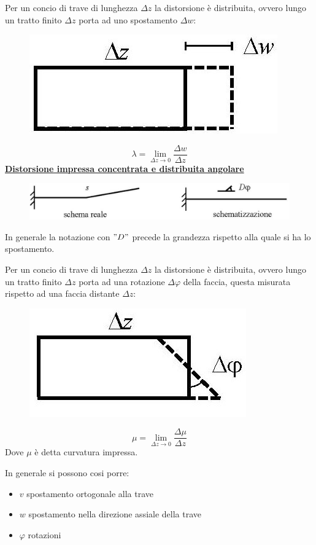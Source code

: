 \documentclass{article}
\begin{document}
\begin{adjustwidth}{2in}{}
		Per un concio di trave di lunghezza $ \Delta z$ la distorsione è distribuita, ovvero lungo un tratto finito $\Delta z$ porta ad uno spostamento $\Delta w$:

\begin{figure}[H]
	\centering
	\includegraphics[width=0.2\linewidth]{"immagini/1.PARTE8_Pagina_04 (3)"}
\end{figure}
		\[ \lambda = \lim_{\Delta z \rightarrow 0} \dfrac{\Delta w}{\Delta z} \]
\newpage	
\underline{\textbf{	Distorsione impressa concentrata e distribuita angolare}}
		
\begin{figure}[H]
	\centering
	\includegraphics[width=0.7\linewidth]{"immagini/1.PARTE8_Pagina_03"}
\end{figure}
		In generale la notazione con $"D"$ precede la grandezza rispetto alla quale si ha lo spostamento.\newline 
		
		Per un concio di trave di lunghezza $ \Delta z$ la distorsione è distribuita, ovvero lungo un tratto finito $\Delta z$ porta ad una rotazione $\Delta \varphi$ della faccia, questa misurata rispetto ad una faccia distante $\Delta z$:

\begin{figure}[H]
	\centering
	\includegraphics[width=0.2\linewidth]{"immagini/1.PARTE8_Pagina_04"}
\end{figure}
		\[ \mu = \lim_{\Delta z \rightarrow 0} \dfrac{\Delta\mu}{\Delta z}\]
		Dove $\mu$ è detta curvatura impressa. \newline 
		
		In generale si possono cosi porre:
		\begin{itemize}
			\item $v$ spostamento ortogonale alla trave
			\item $w$ spostamento nella direzione assiale della trave
			\item $\varphi$ rotazioni 
		\end{itemize}
		

\end{adjustwidth}
\end{document}
